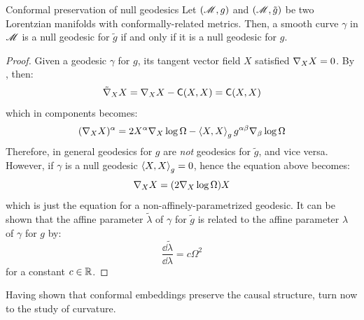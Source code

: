 \begin{proposition}{Conformal preservation of null geodesics}{}
  Let $ (\mathscr{M},g) $ and $ (\mathscr{M} , \tilde{g}) $ be two Lorentzian manifolds with conformally-related metrics. Then, a smooth curve $ \gamma $ in $ \mathscr{M} $ is a null geodesic for $ \tilde{g} $ if and only if it is a null geodesic for $ g $.
\end{proposition}

\begin{proofbox}
  \begin{proof}
    Given a geodesic $ \gamma $ for $ g $, its tangent vector field $ X $ satisfied $ \nabla_X X = 0 $. By , then:
    \begin{equation*}
      \tilde{\nabla}_X X = \nabla_X X - \textsf{C}(X,X) = \textsf{C}(X,X)
    \end{equation*}
    which in components becomes:
    \begin{equation*}
      (\nabla_X X)^\alpha = 2 X^\alpha \nabla_X \log \Omega - \braket{X,X}_g g^{\alpha \beta} \nabla_\beta \log \Omega
    \end{equation*}
    Therefore, in general geodesics for $ g $ are \emph{not} geodesics for $ \tilde{g} $, and vice versa. However, if $ \gamma $ is a null geodesic $ \braket{X , X}_g = 0 $, hence the equation above becomes:
    \begin{equation}
      \nabla_X X = (2 \nabla_X \log \Omega) X
    \end{equation}
    which is just the equation for a non-affinely-parametrized geodesic. It can be shown that the affine parameter $ \tilde{\lambda} $ of $ \gamma $ for $ \tilde{g} $ is related to the affine parameter $ \lambda $ of $ \gamma $ for $ g $ by:
    \begin{equation*}
      \frac{\dd \tilde{\lambda}}{\dd \lambda} = c \Omega^2
    \end{equation*}
    for a constant $ c \in \mathbb{R} $.
  \end{proof}
\end{proofbox}

Having shown that conformal embeddings preserve the causal structure, turn now to the study of curvature.

